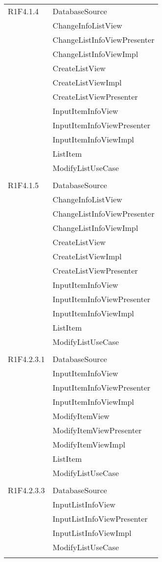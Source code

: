 \begin{center}
\begin{longtable}{|p{7cm}|p{7cm}|}
		R1F4.1.4 & DatabaseSource \\ & ChangeInfoListView \\ & ChangeListInfoViewPresenter \\ & ChangeListInfoViewImpl \\ & CreateListView \\ & CreateListViewImpl \\ & CreateListViewPresenter \\ & InputItemInfoView \\ & InputItemInfoViewPresenter \\ & InputItemInfoViewImpl \\ & ListItem \\ & ModifyListUseCase \\ & \\ \hline
		R1F4.1.5 & DatabaseSource \\ & ChangeInfoListView \\ & ChangeListInfoViewPresenter \\ & ChangeListInfoViewImpl \\ & CreateListView \\ & CreateListViewImpl \\ & CreateListViewPresenter \\ & InputItemInfoView \\ & InputItemInfoViewPresenter \\ & InputItemInfoViewImpl \\ & ListItem \\ & ModifyListUseCase \\ & \\ \hline
		R1F4.2.3.1 & DatabaseSource \\ & InputItemInfoView \\ & InputItemInfoViewPresenter \\ & InputItemInfoViewImpl \\ & ModifyItemView \\ & ModifyItemViewPresenter \\ & ModifyItemViewImpl \\ & ListItem \\ & ModifyListUseCase \\ & \\ \hline
		R1F4.2.3.3 & DatabaseSource \\ & InputListInfoView \\ & InputListInfoViewPresenter \\ & InputListInfoViewImpl \\ & ModifyListUseCase \\ & \\ \hline

\end{longtable}
\end{center}
